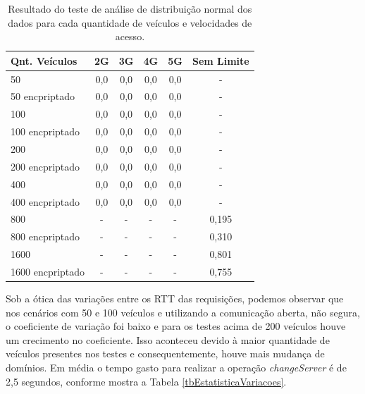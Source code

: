 \documentclass[
	12pt,				%
	oneside,			%
	a4paper,			%
	english,			%
	brazil				%
	]{abntex2ppgsi}
\begin{document}
\begin{table}[!h]
	\centering
	\caption{Resultado do teste de análise de distribuição normal dos dados para cada quantidade de veículos e velocidades de acesso. }
	\label{tbEstatisticaKS}
	\begin{tabular}{|l|c|c|c|c|c|}
		\hline
		\rowcolor[gray]{0.7}
		Qnt. Veículos & 2G  & 3G  & 4G  & 5G & Sem Limite  \\ \hline
		\cellcolor[gray]{0.7}50              & 0,0 & 0,0 & 0,0 & 0,0& - \\ \hline
		\cellcolor[gray]{0.7}50 encpriptado             & 0,0 & 0,0 & 0,0 & 0,0& - \\ \hline
		\cellcolor[gray]{0.7}100             & 0,0 & 0,0 & 0,0 & 0,0& - \\ \hline
		\cellcolor[gray]{0.7}100 encpriptado            & 0,0 & 0,0 & 0,0 & 0,0& - \\ \hline
		\cellcolor[gray]{0.7}200             & 0,0 & 0,0 & 0,0 & 0,0& - \\ \hline
		\cellcolor[gray]{0.7}200 encpriptado            & 0,0 & 0,0 & 0,0 & 0,0& - \\ \hline
		\cellcolor[gray]{0.7}400             & 0,0 & 0,0 & 0,0 & 0,0& - \\ \hline
		\cellcolor[gray]{0.7}400 encpriptado            & 0,0 & 0,0 & 0,0 & 0,0& - \\ \hline
		\cellcolor[gray]{0.7}800             & - & - & - & - & 0,195 \\ \hline
		\cellcolor[gray]{0.7}800 encpriptado             & - & - & - & - & 0,310\\ \hline
		\cellcolor[gray]{0.7}1600            & - & - & - & -& 0,801 \\ \hline
		\cellcolor[gray]{0.7}1600 encpriptado            & - & - & - & -& 0,755 \\ \hline
	\end{tabular}
\end{table}



Sob a ótica das variações entre os RTT das requisições, podemos observar que nos cenários com 50 e 100 veículos e utilizando a comunicação aberta, não segura, o coeficiente de variação foi baixo e para os testes acima de 200 veículos houve um crecimento no coeficiente. Isso aconteceu devido à maior quantidade de veículos presentes nos testes e consequentemente, houve mais mudança de domínios. Em média o tempo gasto para realizar a operação \textit{changeServer} é de 2,5 segundos, conforme mostra a Tabela \ref{tbEstatisticaVariacoes}.
\end{document}
